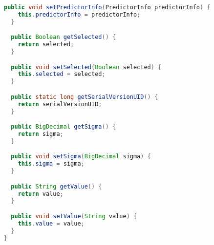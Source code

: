 \begin{lstlisting}[language=Java,basicstyle=\tiny,caption=PredictorInfoDetail.java]
  public void setPredictorInfo(PredictorInfo predictorInfo) {
    this.predictorInfo = predictorInfo;
  }

  public Boolean getSelected() {
    return selected;
  }

  public void setSelected(Boolean selected) {
    this.selected = selected;
  }

  public static long getSerialVersionUID() {
    return serialVersionUID;
  }

  public BigDecimal getSigma() {
    return sigma;
  }

  public void setSigma(BigDecimal sigma) {
    this.sigma = sigma;
  }

  public String getValue() {
    return value;
  }

  public void setValue(String value) {
    this.value = value;
  }
}

\end{lstlisting}
